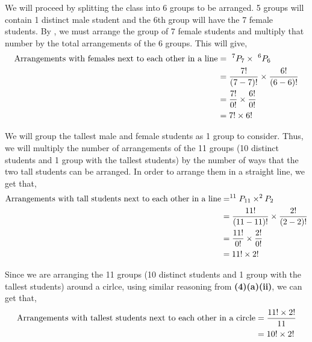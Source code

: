 \begin{subquestions}
\begin{subsubquestions}
We will proceed by splitting the class into 6 groups to be arranged. 5 groups will contain 1 distinct male student and the 6th group will have the 7 female students. By , we must arrange the group of 7 female students and multiply that number by the total arrangements of the 6 groups. This will give,
\begin{align}
	\text{Arrangements with females next to each other in a line} & = ~^7P_7 \times ~^6P_6 \nonumber \\
	                                            & = \frac{7!}{(7-7)!} \times \frac{6!}{(6-6)!} \nonumber \\
	                                            & = \frac{7!}{0!} \times \frac{6!}{0!} \nonumber \\
	                                            & = 7! \times 6! 
\end{align}


\subsubquestion

We will group the tallest male and female students as 1 group to consider. Thus, we will multiply the number of arrangements of the 11 groups (10 distinct students and 1 group with the tallest students) by the number of ways that the two tall students can be arranged. In order to arrange them in a straight line, we get that,
\begin{align}
	\text{Arrangements with tall students next to each other in a line} & = ^{11}P_{11} \times ^{2}P_{2} \nonumber \\
	                                            & = \frac{11!}{(11-11)!} \times \frac{2!}{(2-2)!} \nonumber \\
	                                            & = \frac{11!}{0!} \times \frac{2!}{0!} \nonumber \\
	                                            & = 11! \times 2!
\end{align}

Since we are arranging the 11 groups (10 distinct students and 1 group with the tallest students) around a cirlce, using similar reasoning from \textbf{(4)(a)(ii)}, we can get that,
\begin{align}
	\text{Arrangements with tallest students next to each other in a circle} & = \frac{11! \times 2!}{11} \nonumber \\
																			 & = 10! \times 2! 
\end{align}


\end{subsubquestions}
\end{subquestions}
